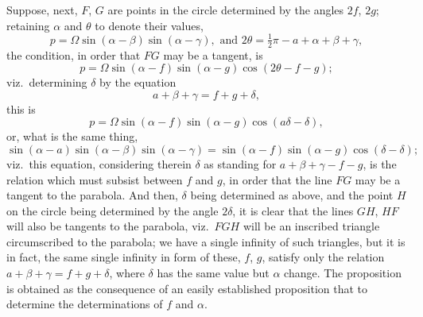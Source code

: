 \documentclass[11pt,a4paper]{book}
\begin{document}
Suppose, next, $F$, $G$ are points in the circle determined by the angles $2f$, $2g$; retaining $\alpha$ and $\theta$ to denote their values,
\[
p = \Omega \sin (\alpha - \beta) \sin (\alpha - \gamma), \text{ and } 2\theta = \tfrac{1}{2}\pi - a + \alpha + \beta + \gamma,
\]
the condition, in order that $FG$ may be a tangent, is
\[
p = \Omega \sin (\alpha - f) \sin (\alpha - g) \cos (2\theta - f - g);
\]
viz.\ determining $\delta$ by the equation
\[
a + \beta + \gamma = f + g + \delta,
\]
this is
\[
p = \Omega \sin (\alpha - f) \sin (\alpha - g) \cos (a\delta - \delta),
\]
or, what is the same thing,
\[
\sin (\alpha - a) \sin (\alpha - \beta) \sin (\alpha - \gamma) = \sin (\alpha - f) \sin (\alpha - g) \cos (\delta - \delta);
\]
viz.\ this equation, considering therein $\delta$ as standing for $a + \beta + \gamma - f - g$, is the relation which must subsist between $f$ and $g$, in order that the line $FG$ may be a tangent to the parabola. And then, $\delta$ being determined as above, and the point $H$ on the circle being determined by the angle $2\delta$, it is clear that the lines $GH$, $HF$ will also be tangents to the parabola, viz.\ $FGH$ will be an inscribed triangle circumscribed to the parabola; we have a single infinity of such triangles, but it is in fact, the same single infinity in form of these, $f$, $g$, satisfy only the relation $a + \beta + \gamma = f + g + \delta$, where $\delta$ has the same value but $\alpha$ change. The proposition is obtained as the consequence of an easily established proposition that to determine the determinations of $f$ and $\alpha$.

\bigskip
\end{document}
